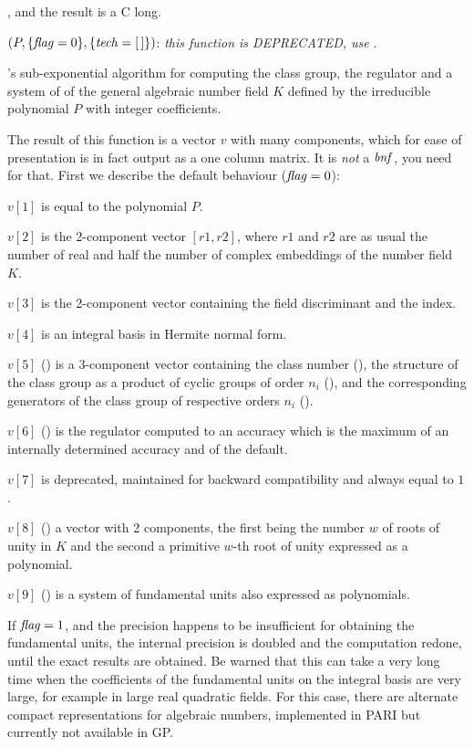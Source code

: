 , and the result is a C long.

$(P,\{\hbox{\it f\kern0pt lag\/}=0\},\{\hbox{\it tech\/}=[\,]\})$: \emph{this function
is DEPRECATED, use }.

's sub-exponential algorithm for computing the class group, the
regulator and a system of  of the general algebraic
number field $K$ defined by the irreducible polynomial $P$ with integer
coefficients.

The result of this function is a vector $v$ with many components, which for
ease of presentation is in fact output as a one column matrix. It is
\emph{not} a $\hbox{\it bnf\/}$, you need  for that. First we describe
the default behaviour ($\hbox{\it f\kern0pt lag\/}=0$):

 $v[1]$ is equal to the polynomial $P$.

 $v[2]$ is the 2-component vector $[r1,r2]$, where $r1$ and $r2$ are as usual
the number of real and half the number of complex embeddings of the number
field $K$.

 $v[3]$ is the 2-component vector containing the field discriminant and the
index.

 $v[4]$ is an integral basis in Hermite normal form.

 $v[5]$ () is a 3-component vector containing the class number
(), the structure of the class group as a product of cyclic
groups of order $n_i$ (), and the corresponding generators
of the class group of respective orders $n_i$ ().

 $v[6]$ () is the regulator computed to an accuracy which is the
maximum of an internally determined accuracy and of the default.

 $v[7]$ is deprecated, maintained for backward compatibility and always equal
to $1$.

 $v[8]$ () a vector with 2 components, the first being the number
$w$ of roots of unity in $K$ and the second a primitive $w$-th root of unity
expressed as a polynomial.

 $v[9]$ () is a system of fundamental units also expressed as
polynomials.

If $\hbox{\it f\kern0pt lag\/}=1$, and the precision happens to be insufficient for obtaining the
fundamental units, the internal precision is doubled and the computation
redone, until the exact results are obtained. Be warned that this can take a
very long time when the coefficients of the fundamental units on the integral
basis are very large, for example in large real quadratic fields.
For this case, there are alternate compact representations for algebraic
numbers, implemented in PARI but currently not available in GP.

